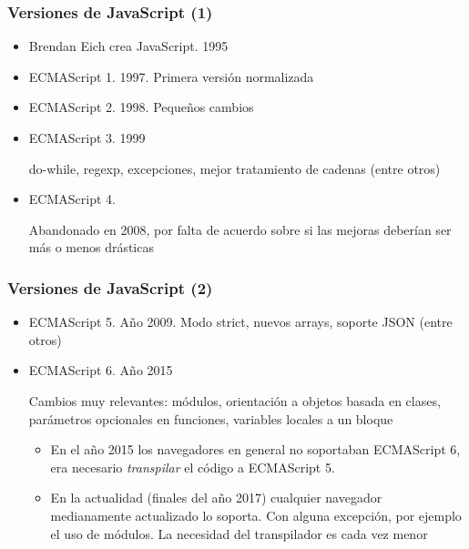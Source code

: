 \documentclass[ucs]{beamer}
\begin{document}
\begin{frame}[fragile]
\frametitle{Versiones de JavaScript (1)}
\begin{itemize}
\item
Brendan Eich crea JavaScript. 1995

\item
ECMAScript 1. 1997. Primera versión normalizada

\item
ECMAScript 2. 1998. Pequeños cambios

\item
ECMAScript 3. 1999

do-while, regexp, excepciones, mejor tratamiento de cadenas (entre otros)

\item
ECMAScript 4. 

Abandonado en 2008, por falta de acuerdo sobre si las mejoras
deberían ser más o menos drásticas

\end{itemize}

\end{frame}

\begin{frame}[fragile]
\frametitle{Versiones de JavaScript (2)}

\begin{itemize}

\item
ECMAScript 5. Año 2009.
Modo strict, nuevos arrays, soporte JSON (entre otros)


\item
ECMAScript 6. Año 2015

Cambios muy relevantes: módulos, orientación a objetos basada en clases,
parámetros opcionales en funciones, variables locales a un bloque

    \begin{itemize}
    \item
En el año 2015 los navegadores en general no soportaban ECMAScript 6,
era necesario \emph{transpilar} el código a ECMAScript 5.

    \item
En la actualidad (finales del año 2017) cualquier navegador medianamente actualizado
lo soporta. Con alguna excepción, por ejemplo el uso de módulos. La necesidad del transpilador es cada vez menor
    \end{itemize}

\end{itemize}
\end{frame}
\end{document}
